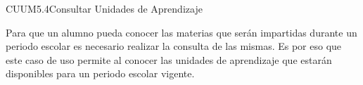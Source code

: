 \begin{UseCase}{CUUM5.4}{Consultar Unidades de Aprendizaje}
	{
		Para que un alumno pueda conocer las materias que serán impartidas durante un periodo escolar es necesario realizar la consulta de las mismas. Es por eso que este caso de uso permite al  conocer las unidades de aprendizaje que estarán disponibles para un periodo escolar vigente.
			
		}
		
		
		

\end{UseCase}
